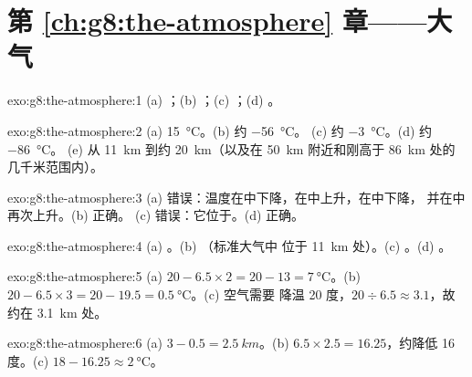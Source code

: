 \section*{第 \ref{ch:g8:the-atmosphere} 章——大气}

\begin{solution}{exo:g8:the-atmosphere:1}
(a) ；(b) ；(c) ；(d) 。
\end{solution}

\begin{solution}{exo:g8:the-atmosphere:2}
(a) \qty{15}{\degreeCelsius}。(b) 约 \qty{-56}{\degreeCelsius}。
(c) 约 \qty{-3}{\degreeCelsius}。(d) 约 \qty{-86}{\degreeCelsius}。
(e) 从 \qty{11}{km} 到约 \qty{20}{km}（以及在
\qty{50}{km} 附近和刚高于 \qty{86}{km} 处的几千米范围内）。
\end{solution}

\begin{solution}{exo:g8:the-atmosphere:3}
(a) 错误：温度在中下降，在中上升，在中下降，
并在中再次上升。(b) 正确。
(c) 错误：它位于。(d) 正确。
\end{solution}

\begin{solution}{exo:g8:the-atmosphere:4}
(a) 。(b) （标准大气中
位于 \qty{11}{km} 处）。(c) 。(d) 。
\end{solution}

\begin{solution}{exo:g8:the-atmosphere:5}
(a) $20 - 6.5 \times 2 = 20 - 13 = \qty{7}{\degreeCelsius}$。(b) $20 -
6.5 \times 3 = 20 - 19.5 = \qty{0.5}{\degreeCelsius}$。(c) 空气需要
降温 20 度，$20 \div 6.5 \approx 3.1$，故约在
\qty{3.1}{km} 处。
\end{solution}

\begin{solution}{exo:g8:the-atmosphere:6}
(a) $3 - 0.5 = \qty{2.5}{km}$。(b) $6.5 \times 2.5 = 16.25$，约降低 16
度。(c) $18 - 16.25 \approx \qty{2}{\degreeCelsius}$。
\end{solution}

